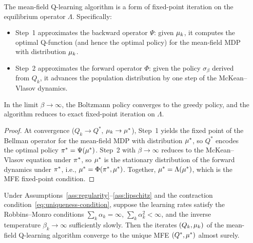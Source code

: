 \documentclass[11pt,a4paper]{article}
\begin{document}
\begin{proposition}
\label{prop:fp-interpretation}
The mean-field Q-learning algorithm is a form of fixed-point
iteration on the equilibrium operator $\Lambda$.  Specifically:
\begin{itemize}[nosep]
  \item Step~1 approximates the backward operator $\Psi$: given
    $\mu_k$, it computes the optimal Q-function (and hence
    the optimal policy) for the mean-field MDP with distribution
    $\mu_k$.
  \item Step~2 approximates the forward operator $\Phi$: given the
    policy $\sigma_\beta$ derived from $Q_k$, it advances the
    population distribution by one step of the McKean--Vlasov
    dynamics.
\end{itemize}
In the limit $\beta \to \infty$, the Boltzmann policy converges
to the greedy policy, and the algorithm reduces to exact
fixed-point iteration on $\Lambda$.
\end{proposition}

\begin{proof}
At convergence ($Q_k \to Q^*$, $\mu_k \to \mu^*$),
Step~1 yields the fixed point of the Bellman operator for the
mean-field MDP with distribution $\mu^*$, so $Q^*$ encodes
the optimal policy $\pi^* = \Psi(\mu^*)$.  Step~2 with
$\beta \to \infty$ reduces to the McKean--Vlasov equation under
$\pi^*$, so $\mu^*$ is the stationary distribution of
the forward dynamics under $\pi^*$, i.e.,
$\mu^* = \Phi(\pi^*, \mu^*)$.  Together,
$\mu^* = \Lambda(\mu^*)$, which is the MFE
fixed-point condition.
\end{proof}

\begin{proposition}
\label{prop:mf-q-convergence}
Under Assumptions~\ref{ass:regularity}--\ref{ass:lipschitz} and the
contraction condition~\eqref{eq:uniqueness-condition}, suppose the
learning rates satisfy the Robbins--Monro conditions
$\sum_k \alpha_k = \infty$, $\sum_k \alpha_k^2 < \infty$, and
the inverse temperature $\beta_k \to \infty$ sufficiently slowly.
Then the iterates $(Q_k, \mu_k)$ of the mean-field
Q-learning algorithm converge to the unique MFE $(Q^*, \mu^*)$
almost surely.
\end{proposition}
\end{document}
